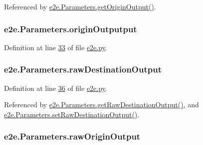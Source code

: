 Referenced by \hyperlink{e2e_8py_source_l00090}{e2e.\+Parameters.\+get\+Origin\+Output()}.

\subsubsection[{\texorpdfstring{origin\+Outputput}{originOutputput}}]{\setlength{\rightskip}{0pt plus 5cm}e2e.\+Parameters.\+origin\+Outputput}\hypertarget{classe2e_1_1_parameters_acece0ee5caaa6322c3a337c3b7f00599}{}\label{classe2e_1_1_parameters_acece0ee5caaa6322c3a337c3b7f00599}


Definition at line \hyperlink{e2e_8py_source_l00033}{33} of file \hyperlink{e2e_8py_source}{e2e.\+py}.

\subsubsection[{\texorpdfstring{raw\+Destination\+Output}{rawDestinationOutput}}]{\setlength{\rightskip}{0pt plus 5cm}e2e.\+Parameters.\+raw\+Destination\+Output}\hypertarget{classe2e_1_1_parameters_a84b319098084ed505e089a600e154f6e}{}\label{classe2e_1_1_parameters_a84b319098084ed505e089a600e154f6e}


Definition at line \hyperlink{e2e_8py_source_l00036}{36} of file \hyperlink{e2e_8py_source}{e2e.\+py}.



Referenced by \hyperlink{e2e_8py_source_l00108}{e2e.\+Parameters.\+get\+Raw\+Destination\+Output()}, and \hyperlink{e2e_8py_source_l00105}{e2e.\+Parameters.\+set\+Raw\+Destination\+Output()}.

\subsubsection[{\texorpdfstring{raw\+Origin\+Output}{rawOriginOutput}}]{\setlength{\rightskip}{0pt plus 5cm}e2e.\+Parameters.\+raw\+Origin\+Output}\hypertarget{classe2e_1_1_parameters_a62b586d9863422872833e34814ac51e6}{}\label{classe2e_1_1_parameters_a62b586d9863422872833e34814ac51e6}


